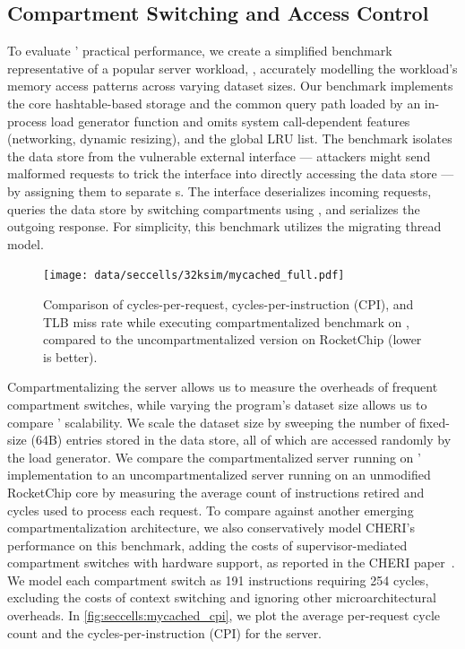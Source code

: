 \subsection{Compartment Switching and Access Control}
To evaluate \seccells' practical performance, we create a simplified 
benchmark representative of a popular server workload, 
, accurately modelling the workload's memory access 
patterns across varying dataset sizes.
Our benchmark implements the core hashtable-based storage and the 
common query path loaded by an in-process load generator function
and omits system call-dependent features (networking, dynamic resizing),
and the global LRU list.
The benchmark isolates the data store from the vulnerable external interface
--- attackers might send malformed requests to trick the interface into directly
accessing the data store ---
by assigning them to separate \secdiv{}s.
The interface deserializes incoming requests, queries the data store
by switching compartments using \sdswitch, and serializes the
outgoing response.
For simplicity, this benchmark utilizes the migrating thread model.

\begin{figure}
  \centering
  \texttt{[image: data/seccells/32ksim/mycached\_full.pdf]}
  \caption[\seccells performance comparison: ]
          {Comparison of cycles-per-request,   
          cycles-per-instruction (CPI), and
          TLB miss rate
          while executing compartmentalized  benchmark on 
          \seccells, compared to the uncompartmentalized version on RocketChip
          (lower is better).
          }
  \label{fig:seccells:mycached_cpi}
\end{figure}

Compartmentalizing the server allows us to measure the overheads
of frequent compartment switches, while varying the program's
dataset size allows us to compare \seccells' scalability.
We scale the dataset size by sweeping the number of fixed-size (64B)
entries stored in the data store, all of which are accessed randomly
by the load generator.
We compare the compartmentalized server running on \seccells'
implementation to an uncompartmentalized server running on
an unmodified RocketChip core by measuring the average count of
instructions retired and cycles used to process each request.
To compare against another emerging compartmentalization architecture,
we also conservatively model CHERI's performance on this benchmark,
adding the costs of supervisor-mediated compartment
switches with hardware support, as reported in the 
CHERI paper~\cite{WatsonWNMACDDGL15}.
We model each compartment switch as 191 instructions requiring 254 cycles,
excluding the costs of context switching and
ignoring other microarchitectural overheads.
In \autoref{fig:seccells:mycached_cpi}, we plot the average per-request 
cycle count and the cycles-per-instruction (CPI) for the server.

